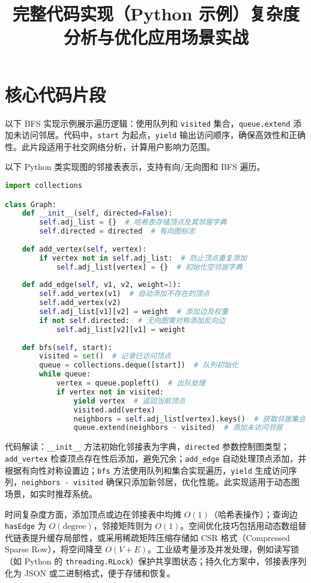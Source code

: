 \chapter{核心代码片段}
以下 BFS 实现示例展示遍历逻辑：使用队列和 \texttt{visited} 集合，\texttt{queue.extend} 添加未访问邻居。代码中，\texttt{start} 为起点，\texttt{yield} 输出访问顺序，确保高效性和正确性。此片段适用于社交网络分析，计算用户影响力范围。\par
\title{完整代码实现（Python 示例）}
以下 Python 类实现图的邻接表表示，支持有向/无向图和 BFS 遍历。\par
\begin{lstlisting}[language=python]
import collections

class Graph:
    def __init__(self, directed=False):
        self.adj_list = {}  # 哈希表存储顶点及其邻居字典
        self.directed = directed  # 有向图标志
    
    def add_vertex(self, vertex):
        if vertex not in self.adj_list:  # 防止顶点重复添加
            self.adj_list[vertex] = {}  # 初始化空邻居字典
    
    def add_edge(self, v1, v2, weight=1):
        self.add_vertex(v1)  # 自动添加不存在的顶点
        self.add_vertex(v2)
        self.adj_list[v1][v2] = weight  # 添加边及权重
        if not self.directed:  # 无向图需对称添加反向边
            self.adj_list[v2][v1] = weight
    
    def bfs(self, start):
        visited = set()  # 记录已访问顶点
        queue = collections.deque([start])  # 队列初始化
        while queue:
            vertex = queue.popleft()  # 出队处理
            if vertex not in visited:
                yield vertex  # 返回当前顶点
                visited.add(vertex)
                neighbors = self.adj_list[vertex].keys()  # 获取邻居集合
                queue.extend(neighbors - visited)  # 添加未访问邻居
\end{lstlisting}
代码解读：\texttt{\_{}\_{}init\_{}\_{}} 方法初始化邻接表为字典，\texttt{directed} 参数控制图类型；\texttt{add\_{}vertex} 检查顶点存在性后添加，避免冗余；\texttt{add\_{}edge} 自动处理顶点添加，并根据有向性对称设置边；\texttt{bfs} 方法使用队列和集合实现遍历，\texttt{yield} 生成访问序列，\texttt{neighbors - visited} 确保只添加新邻居，优化性能。此实现适用于动态图场景，如实时推荐系统。\par
\title{复杂度分析与优化}
时间复杂度方面，添加顶点或边在邻接表中均摊 $O(1)$（哈希表操作）；查询边 \texttt{hasEdge} 为 $O(\text{degree})$，邻接矩阵则为 $O(1)$。空间优化技巧包括用动态数组替代链表提升缓存局部性，或采用稀疏矩阵压缩存储如 CSR 格式（Compressed Sparse Row），将空间降至 $O(V + E)$。工业级考量涉及并发处理，例如读写锁（如 Python 的 \texttt{threading.RLock}）保护共享图状态；持久化方案中，邻接表序列化为 JSON 或二进制格式，便于存储和恢复。\par
\title{应用场景实战}
